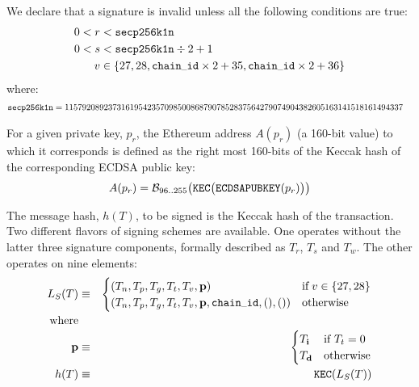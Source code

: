 \documentclass[9pt,oneside]{amsart}
\begin{document}
\newcommand{\slimit}{\ensuremath{\text{s-limit}}}

We declare that a signature is invalid unless all the following conditions are true:
\begin{align}
0 < r &< \mathtt{\tiny secp256k1n} \\
0 < s &< \mathtt{\tiny secp256k1n} \div 2 + 1 \\
v &\in \{27,28,\mathtt{\tiny chain\_id} \times 2 + 35, \mathtt{\tiny chain\_id} \times 2 + 36\}
\end{align}
where:
\begin{align}
\mathtt{\tiny secp256k1n} &= 115792089237316195423570985008687907852837564279074904382605163141518161494337
\end{align}

For a given private key, $p_r$, the Ethereum address $A(p_r)$ (a 160-bit value) to which it corresponds is defined as the right most 160-bits of the Keccak hash of the corresponding ECDSA public key:
\begin{equation}
A(p_r) = \mathcal{B}_{96..255}\big(\mathtt{\tiny KEC}\big( \mathtt{\small ECDSAPUBKEY}(p_r) \big) \big)
\end{equation}

The message hash, $h(T)$, to be signed is the Keccak hash of the transaction. Two different flavors of signing schemes are available. One operates without the latter three signature components, formally described as $T_r$, $T_s$ and $T_w$. The other operates on nine elements:
\begin{eqnarray}
L_S(T) & \equiv & \begin{cases}
(T_n, T_p, T_g, T_t, T_v, \mathbf{p}) & \text{if} \; v \in \{27, 28\} \\
(T_n, T_p, T_g, T_t, T_v, \mathbf{p}, \mathtt{\tiny chain\_id}, (), ()) & \text{otherwise} \\
\end{cases} \\
\nonumber \text{where} \\
\nonumber \mathbf{p} & \equiv & \begin{cases}
T_{\mathbf{i}} & \text{if}\ T_t = 0 \\
T_{\mathbf{d}} & \text{otherwise}
\end{cases} \\
h(T) & \equiv & \mathtt{\small KEC}( L_S(T) )
\end{eqnarray}
\end{document}
